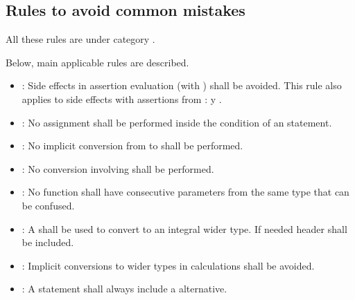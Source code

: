 \subsection{Rules to avoid common mistakes}

All these rules are under category
.

Below, main applicable rules are described.

\begin{itemize}

\item {}:
Side effects in assertion evaluation (with ) shall be avoided.
This rule also applies to side effects with assertions from :
 y .

\item {}:
No assignment shall be performed inside the condition of an  statement.

\item {}:
No implicit conversion from  to  shall be performed.

\item {}:
No conversion involving  shall be performed.

\item {}: 
No function shall have consecutive parameters from the same type that can be confused.

\item {}: 
A  shall be used to convert to an integral wider type.
If needed header  shall be included.

\item {}:
Implicit conversions to wider types in calculations shall be avoided.

\item {}:
A  statement shall always include a  alternative.

\end{itemize}
